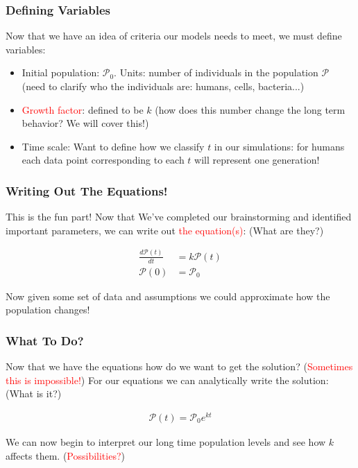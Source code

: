 \documentclass[serif]{beamer}
\begin{document}
\begin{frame}
\frametitle{Defining Variables} 

Now that we have an idea of criteria our models needs to meet, we must define variables: 

\begin{itemize}
\item Initial population: $ \mathcal{P}_0$. Units: number of individuals in the population $\mathcal{P}$ (need to clarify who the individuals are: humans, cells, bacteria...)
\item \textcolor{red}{Growth factor}: defined to be $k$ (how does this number change the long term behavior? We will cover this!)
\item Time scale: Want to define how we classify $t$ in our simulations: for humans each data point corresponding to each $t$ will represent one generation! 
\end{itemize} 

\end{frame}




\begin{frame}
\frametitle{Writing Out The Equations!}

This is the fun part! Now that We've completed our brainstorming and identified important parameters, we can write out \textcolor{red}{the equation(s)}: (What are they?)

\pause

\begin{align*}
\frac{d\mathcal{P}(t)}{dt} &= k\mathcal{P}(t)\\
\mathcal{P}(0) &= \mathcal{P}_0
\end{align*}

Now given some set of data and assumptions we could approximate how the population changes! 

\end{frame}

\begin{frame}
\frametitle{What To Do?}

Now that we have the equations how do we want to get the solution? (\textcolor{red}{Sometimes this is impossible!}) For our equations we can analytically write the solution: (What is it?) 

\pause

\begin{align*}
\mathcal{P}(t) = \mathcal{P}_0e^{kt}
\end{align*}

We can now begin to interpret our long time population levels and see how $k$ affects them. (\textcolor{red}{Possibilities?})

\end{frame}
\end{document}
